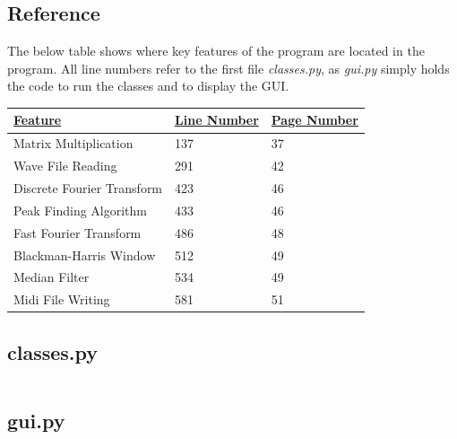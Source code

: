 \documentclass[12pt]{report}
\begin{document}
\subsection*{Reference}

The below table shows where key features of the program are located in the program. All line numbers refer to the first file \textit{classes.py}, as \textit{gui.py} simply holds the code to run the classes and to display the GUI.

\begin{table}[H]
\begin{tabular}{|l|l|l|}
\hline
{\ul \textbf{Feature}}     & {\ul \textbf{Line Number}} & {\ul \textbf{Page Number}} \\ \hline
Matrix Multiplication      & 137                        & 37                         \\ \hline
Wave File Reading          & 291                        & 42                         \\ \hline
Discrete Fourier Transform & 423                        & 46                         \\ \hline
Peak Finding Algorithm     & 433                        & 46                         \\ \hline
Fast Fourier Transform     & 486                        & 48                         \\ \hline
Blackman-Harris Window     & 512                        & 49                         \\ \hline
Median Filter              & 534                        & 49                         \\ \hline
Midi File Writing          & 581                        & 51                         \\ \hline
\end{tabular}
\end{table}



\subsection*{classes.py}
\inputminted[linenos, breaklines]{python}{code/classes.py}

\subsection*{gui.py}
\inputminted[linenos, breaklines]{python}{code/gui.py}
\end{document}
